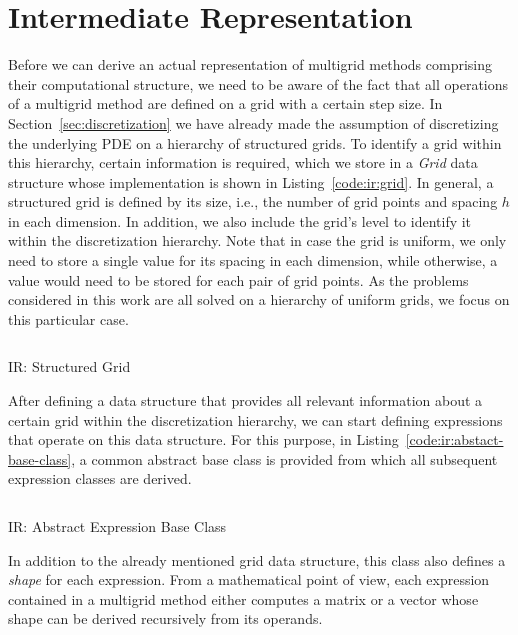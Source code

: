 \section{Intermediate Representation}
\label{sec:intermediate-representation}
Before we can derive an actual representation of multigrid methods comprising their computational structure, we need to be aware of the fact that all operations of a multigrid method are defined on a grid with a certain step size.
In Section~\ref{sec:discretization} we have already made the assumption of discretizing the underlying PDE on a hierarchy of structured grids.
To identify a grid within this hierarchy, certain information is required, which we store in a \emph{Grid} data structure whose implementation is shown in Listing~\ref{code:ir:grid}.
In general, a structured grid is defined by its size, i.e., the number of grid points and spacing $h$ in each dimension.
In addition, we also include the grid's level to identify it within the discretization hierarchy.
Note that in case the grid is uniform, we only need to store a single value for its spacing in each dimension, while otherwise, a value would need to be stored for each pair of grid points.
As the problems considered in this work are all solved on a hierarchy of uniform grids, we focus on this particular case.
\begin{listing}
	\inputminted{python}{evostencils/ir/grid.py}
	\caption{IR: Structured Grid}
	\label{code:ir:grid}
\end{listing}
After defining a data structure that provides all relevant information about a certain grid within the discretization hierarchy, we can start defining expressions that operate on this data structure.
For this purpose, in Listing~\ref{code:ir:abstact-base-class}, a common abstract base class is provided from which all subsequent expression classes are derived.
\begin{listing}
	\inputminted{python}{evostencils/ir/expression.py}
	\caption{IR: Abstract Expression Base Class}
	\label{code:ir:abstact-base-class}
\end{listing}
In addition to the already mentioned grid data structure, this class also defines a \emph{shape} for each expression.
From a mathematical point of view, each expression contained in a multigrid method either computes a matrix or a vector whose shape can be derived recursively from its operands.
